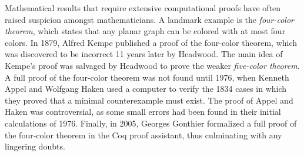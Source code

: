 Mathematical results that require extensive computational proofs have often raised suspicion amongst mathematicians. 
A landmark example is the \emph{four-color theorem}, which states that any planar graph can be colored with at most four colors. 
In 1879, Alfred Kempe published a proof of the four-color theorem, which was discovered to be incorrect 11 years later by Headwood. 
The main idea of Kempe's proof was salvaged by Headwood to prove the weaker \emph{five-color theorem}. 
A full proof of the four-color theorem was not found until 1976, when Kenneth Appel and Wolfgang Haken used a computer to verify the 1834 cases in which they proved that a minimal counterexample must exist.
The proof of Appel and Haken was controversial, as some small errors had been found in their initial calculations of 1976. Finally, in 2005, Georges Gonthier formalized a full proof of the four-color theorem in the \textsf{Coq} proof assistant, thus culminating with any lingering doubts.


